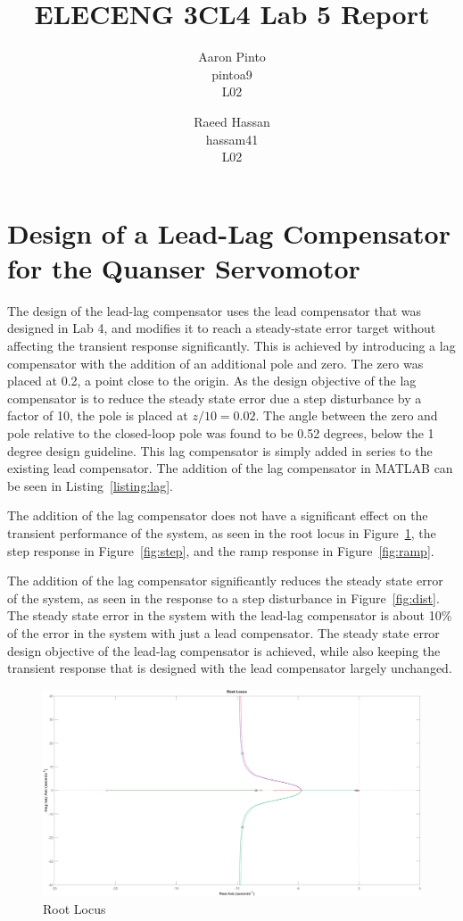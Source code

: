 \documentclass[12pt]{article}
\title{ELECENG 3CL4 Lab 5 Report}
\author{
    Aaron Pinto \\
    pintoa9 \\
    L02
    \and
    Raeed Hassan \\
    hassam41 \\
    L02
}
\begin{document}
\maketitle
\clearpage

\section{Design of a Lead-Lag Compensator for the Quanser Servomotor}
The design of the lead-lag compensator uses the lead compensator that was designed in Lab 4, and modifies it to reach a steady-state error target without affecting the transient response significantly. This is achieved by introducing a lag compensator with the addition of an additional pole and zero. The zero was placed at 0.2, a point close to the origin. As the design objective of the lag compensator is to reduce the steady state error due a step disturbance by a factor of 10, the pole is placed at $z/10 = 0.02$. The angle between the zero and pole relative to the closed-loop pole was found to be 0.52 degrees, below the 1 degree design guideline. This lag compensator is simply added in series to the existing lead compensator. The addition of the lag compensator in MATLAB can be seen in Listing~\ref{listing:lag}.



The addition of the lag compensator does not have a significant effect on the transient performance of the system, as seen in the root locus in Figure~\ref{fig:rlocus}, the step response in Figure~\ref{fig:step}, and the ramp response in Figure~\ref{fig:ramp}.

The addition of the lag compensator significantly reduces the steady state error of the system, as seen in the response to a step disturbance in Figure~\ref{fig:dist}. The steady state error in the system with the lead-lag compensator is about 10\% of the error in the system with just a lead compensator. The steady state error design objective of the lead-lag compensator is achieved, while also keeping the transient response that is designed with the lead compensator largely unchanged.

\begin{figure}[h]
    \centering
    \includegraphics[width=\textwidth]{rlocus}
    \caption{\label{fig:rlocus}Root Locus}
\end{figure}
\end{document}
